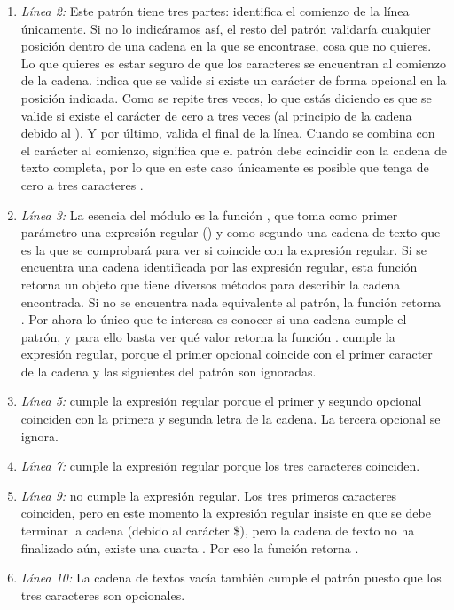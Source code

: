 \begin{enumerate}

\item \emph{Línea 2:} Este  patrón tiene tres partes: \codigo{\^} identifica el comienzo de la línea únicamente. Si no lo indicáramos así, el resto del patrón validaría cualquier posición dentro de una cadena en la que se encontrase, cosa que no quieres. Lo que quieres es estar seguro de que los caracteres  se encuentran al comienzo de la cadena.  indica que se valide si existe un carácter  de forma opcional en la posición indicada. Como se repite tres veces, lo que estás diciendo es que se valide si existe el carácter  de cero a tres veces (al principio de la cadena debido al \codigo{\^}). Y por último, \codigo{\$} valida el final de la línea. Cuando se combina con el carácter \codigo{\^} al comienzo, significa que el patrón debe coincidir con la cadena de texto completa, por lo que en este caso únicamente es posible que tenga de cero a tres caracteres .

\item \emph{Línea 3:} La esencia del módulo  es la función , que toma como primer parámetro una expresión regular () y como segundo una cadena de texto que es la que se comprobará para ver si coincide con la expresión regular. Si se encuentra una cadena identificada por las expresión regular, esta función retorna un objeto que tiene diversos métodos para describir la cadena encontrada. Si no se encuentra nada equivalente al patrón, la función retorna . Por ahora lo único que te interesa es conocer si una cadena cumple el patrón, y para ello basta ver qué valor retorna la función .  cumple la expresión regular, porque el primer  opcional coincide con el primer caracter de la cadena y las siguientes  del patrón son ignoradas.

\item \emph{Línea 5:}  cumple la expresión regular porque el primer y segundo  opcional coinciden con la primera y segunda letra  de la cadena. La tercera  opcional se ignora.

\item \emph{Línea 7:}  cumple la expresión regular porque los tres caracteres  coinciden.

\item \emph{Línea 9:}  no cumple la expresión regular. Los tres primeros caracteres coinciden, pero en este momento la expresión regular insiste en que se debe terminar la cadena (debido al carácter \$), pero la cadena de texto no ha finalizado aún, existe una cuarta . Por eso la función  retorna .

\item \emph{Línea 10:} La cadena de textos vacía también cumple el patrón puesto que los tres caracteres  son opcionales.

\end{enumerate}

